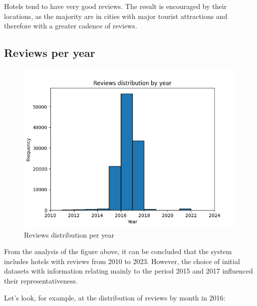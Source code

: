 \documentclass[sigconf]{acmart}
\begin{document}
Hotels tend to have very good reviews. The result is encouraged by their locations, as the majority are in cities with major tourist attractions and therefore with a greater cadence of reviews.

\subsection{Reviews per year}

\begin{figure}[h]
  \centering
  \includegraphics[width=\linewidth]{imgs/date_distributions.png}
  \caption{Reviews distribution per year}
\end{figure}

From the analysis of the figure above, it can be concluded that the system includes hotels with reviews from 2010 to 2023. However, the choice of initial datasets with information relating mainly to the period 2015 and 2017 influenced their representativeness.

Let's look, for example, at the distribution of reviews by month in 2016:
\end{document}
